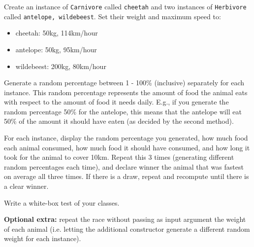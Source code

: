   Create an instance of \texttt{Carnivore} called \texttt{cheetah} and two instances of \texttt{Herbivore} called \texttt{antelope, wildebeest}. Set their weight and maximum speed to:
  \begin{itemize}
  \item cheetah: 50kg, 114km/hour
  \item antelope: 50kg, 95km/hour
  \item wildebeest: 200kg, 80km/hour
  \end{itemize}
  
  Generate a random percentage between 1 - 100\% (inclusive) separately for each instance. This random percentage represents the amount of food the animal eats with respect to the amount of food it needs daily. E.g., if you generate the random percentage 50\% for the antelope, this means that the antelope will eat 50\% of the amount it should have eaten (as decided by the second method). 
  
  For each instance, display the random percentage you generated, how much food each animal consumed, how much food it should have consumed, and how long it took for the animal to cover 10km. 
  Repeat this 3 times (generating different random percentages each time), and declare winner the animal that was fastest on average all three times. If there is a draw, repeat and recompute until there is a clear winner.
  
  Write a white-box test of your classes. %
  
  \textbf{Optional extra:} repeat the race without passing as input argument the weight of each animal (i.e. letting the additional constructor generate a different random weight for each instance).
